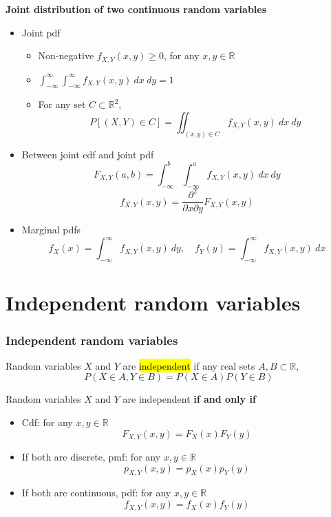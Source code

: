\documentclass[slidestop,compress,mathserif]{beamer}
\begin{document}
\begin{frame}%

{\bf Joint distribution of two continuous random variables }
\begin{itemize}
\item Joint pdf
  \begin{itemize}
  \item Non-negative $f_{X, Y}(x, y) \geq 0$, for any $x, y \in \mathbb{R}$
  \item $\int_{-\infty}^{\infty} \int_{-\infty}^{\infty} f_{X, Y}(x,y) ~dx~dy = 1$
  \item For any set $C \subset \mathbb{R}^2$,
  \[ P[(X, Y) \in C] = \iint_{(x, y) \in C} f_{X, Y}(x,y) ~dx~dy\]
  \end{itemize}
\item Between joint cdf and joint pdf
\[ F_{X, Y}(a,b) = \int_{-\infty}^{b} \int_{-\infty}^{a}f_{X, Y}(x,y)~dx~dy \]
\[ f_{X, Y}(x,y) = \frac{\partial^2}{\partial x \partial y} F_{X, Y}(x,y) \]

\item Marginal pdfs
\[ f_X(x) = \int_{-\infty}^\infty f_{X, Y}(x,y)~dy, \quad f_Y(y) = \int_{-\infty}^\infty f_{X, Y}(x,y)~dx \]
\end{itemize}


\end{frame}



\section{Independent random variables}
\begin{frame}\frametitle{Independent random variables}
\begin{defn}
Random variables $X$ and $Y$ are \hl{independent} if any real sets $A, B \subset \mathbb{R}$,
\[P(X \in A, Y \in B) = P(X \in A) P(Y \in B)\]
\end{defn}

Random variables $X$ and $Y$ are independent {\bf if and only if}
\begin{itemize}
\item Cdf: for any $x, y \in \mathbb{R}$
\[F_{X, Y}(x, y) = F_X(x) F_Y(y)\]
\item If both are discrete, pmf: for any $x, y \in \mathbb{R}$
\[p_{X, Y}(x, y) = p_X(x) p_Y(y)\]
\item If both are continuous, pdf: for any $x, y \in \mathbb{R}$
\[f_{X, Y}(x, y) = f_X(x) f_Y(y)\]

\end{itemize}
\end{frame}
\end{document}
